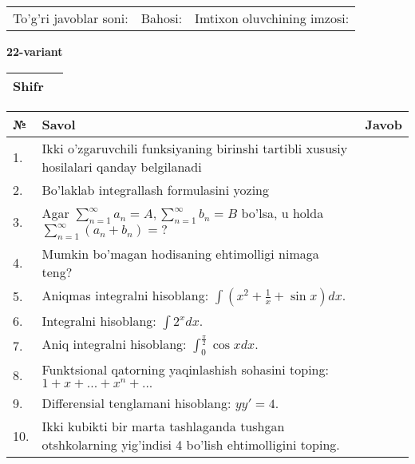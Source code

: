 \documentclass{article}
\begin{document}
  \begin{tabular}{lll}
  To'g'ri javoblar soni: \underline{\hspace{1.5cm}} & 
  Bahosi: \underline{\hspace{1.5cm}} & 
  Imtixon oluvchining imzosi: \underline{\hspace{2cm}} \\
  \end{tabular}
  
  \egroup
  
  \newpage
  
  
  \textbf{22-variant}\\
  
  \bgroup
  \def\arraystretch{1.6} %
  
  \begin{tabular}{|m{5.7cm}|m{9.5cm}|}
  \hline
  Shifr & \\
  \hline
  \end{tabular}
  
  \vspace{1cm}
  
  \begin{tabular}{|m{0.7cm}|m{10cm}|m{4cm}|}
  \hline
  № & Savol & Javob \\
  \hline
  1. & Ikki o'zgaruvchili funksiyaning birinshi tartibli xususiy hosilalari qanday belgilanadi &  \\
  \hline
  2. & Bo'laklab integrallash formulasini yozing &  \\
  \hline
  3. & Agar \(\sum_{n = 1}^{\infty}a_{n} = A,\sum_{n = 1}^{\infty}b_{n} = B\) bo'lsa, u holda \(\sum_{n = 1}^{\infty}\left( a_{n} + b_{n} \right) = ?\) &  \\
  \hline
  4. & Mumkin bo'magan hodisaning ehtimolligi nimaga teng? &  \\
  \hline
  5. & Aniqmas integralni hisoblang: \(\int {\left( x^{2} + \frac{1}{x} + \sin x \right)dx}\). &  \\
  \hline
  6. & Integralni hisoblang: \(\int {2^{x}dx}\). &  \\
  \hline
  7. & Aniq integralni hisoblang: \(\int_{0}^{\frac{\pi}{2}}{\cos xdx}\). &  \\
  \hline
  8. & Funktsional qatorning yaqinlashish sohasini toping:\(1 + x + ... + x^{n} + ...\) &  \\
  \hline
  9. & Differensial tenglamani hisoblang: \(yy' = 4\). &  \\
  \hline
  10. & Ikki kubikti bir marta tashlaganda tushgan otshkolarning yig'indisi 4 bo'lish ehtimolligini toping. &  \\
  \hline
  \end{tabular}
  
\end{document}
